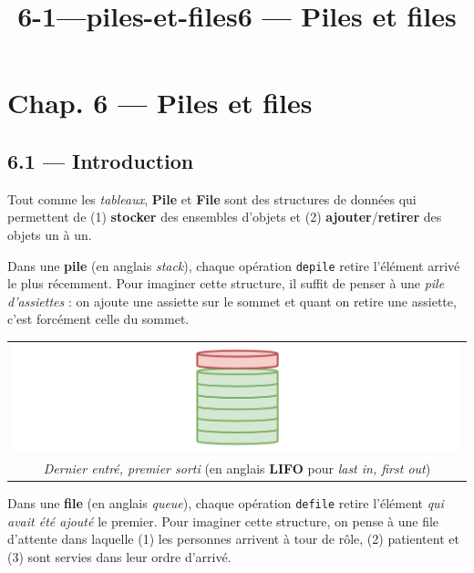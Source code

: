 \documentclass[a4paper,17pt]{extarticle}
\title{6-1---piles-et-files}
\begin{document}
    
    \title{6 --- Piles et files}

    
    

    
    \hypertarget{chap.-6-piles-et-files}{%
\section{Chap. 6 --- Piles et files}\label{chap.-6-piles-et-files}}

    \hypertarget{introduction}{%
\subsection{6.1 --- Introduction}\label{introduction}}

    Tout comme les \emph{tableaux}, \textbf{Pile} et \textbf{File} sont des
structures de données qui permettent de (1) \textbf{stocker} des
ensembles d'objets et (2) \textbf{ajouter}/\textbf{retirer} des objets
un à un.

    Dans une \textbf{pile} (en anglais \emph{stack}), chaque opération
\texttt{depile} retire l'élément arrivé le plus récemment. Pour imaginer
cette structure, il suffit de penser à une \emph{pile d'assiettes} : on
ajoute une assiette sur le sommet et quant on retire une assiette, c'est
forcément celle du sommet.

\begin{longtable}[]{@{}c@{}}
\toprule
\endhead
\includegraphics{img-pile.png}\tabularnewline
\emph{Dernier entré, premier sorti} (en anglais \textbf{LIFO} pour
\emph{last in, first out})\tabularnewline
\bottomrule
\end{longtable}

    Dans une \textbf{file} (en anglais \emph{queue}), chaque opération
\texttt{defile} retire l'élément \emph{qui avait été ajouté} le premier.
Pour imaginer cette structure, on pense à une file d'attente dans
laquelle (1) les personnes arrivent à tour de rôle, (2) patientent et
(3) sont servies dans leur ordre d'arrivé.
\end{document}
